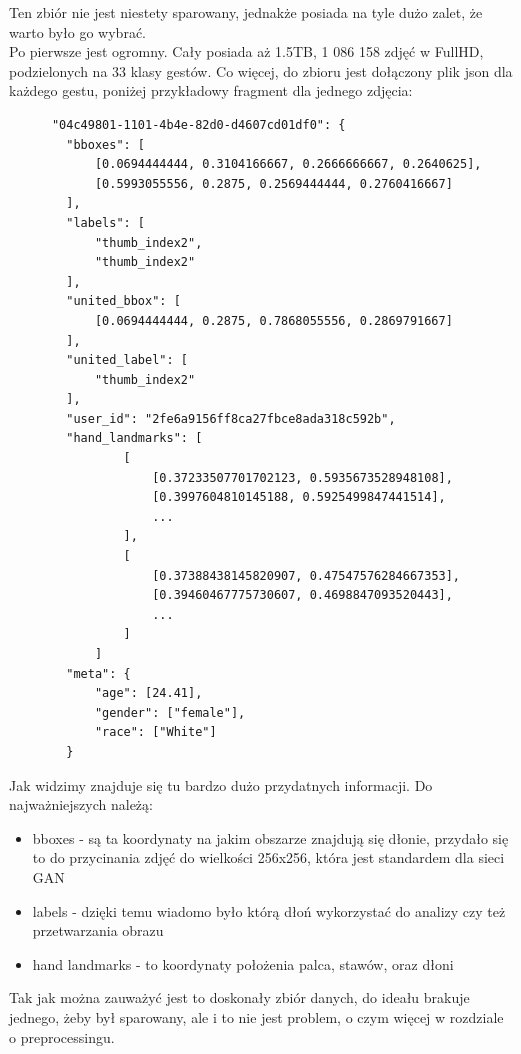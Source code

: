 \documentclass[12pt]{article}
\begin{document}
\begin{sloppypar}
{{    Ten zbiór nie jest niestety sparowany, jednakże posiada na tyle dużo zalet, że warto było go wybrać. \\
    Po pierwsze jest ogromny. Cały posiada aż 1.5TB, 1 086 158 zdjęć w FullHD, podzielonych na 33 klasy gestów. 
    Co więcej, do zbioru jest dołączony plik json dla każdego gestu, poniżej przykładowy fragment dla jednego zdjęcia:
    \begin{lstlisting}
      "04c49801-1101-4b4e-82d0-d4607cd01df0": {
        "bboxes": [
            [0.0694444444, 0.3104166667, 0.2666666667, 0.2640625],
            [0.5993055556, 0.2875, 0.2569444444, 0.2760416667]
        ],
        "labels": [
            "thumb_index2",
            "thumb_index2"
        ],
        "united_bbox": [
            [0.0694444444, 0.2875, 0.7868055556, 0.2869791667]
        ],
        "united_label": [
            "thumb_index2"
        ],
        "user_id": "2fe6a9156ff8ca27fbce8ada318c592b",
        "hand_landmarks": [
                [
                    [0.37233507701702123, 0.5935673528948108],
                    [0.3997604810145188, 0.5925499847441514],
                    ...
                ],
                [
                    [0.37388438145820907, 0.47547576284667353],
                    [0.39460467775730607, 0.4698847093520443],
                    ...
                ]
            ]
        "meta": {
            "age": [24.41],
            "gender": ["female"],
            "race": ["White"]
        }
    \end{lstlisting}
    Jak widzimy znajduje się tu bardzo dużo przydatnych informacji. Do najważniejszych należą:
    \begin{itemize}
      \item bboxes - są ta koordynaty na jakim obszarze znajdują się dłonie, przydało się to do przycinania zdjęć do wielkości 256x256, która jest standardem dla sieci GAN
      \item labels - dzięki temu wiadomo było którą dłoń wykorzystać do analizy czy też przetwarzania obrazu
      \item hand landmarks - to koordynaty położenia palca, stawów, oraz dłoni
    \end{itemize}
    Tak jak można zauważyć jest to doskonały zbiór danych, do ideału brakuje jednego, żeby był sparowany, ale i to nie jest problem, o czym więcej w rozdziale o preprocessingu. 
    }
}
\end{sloppypar}
\end{document}
